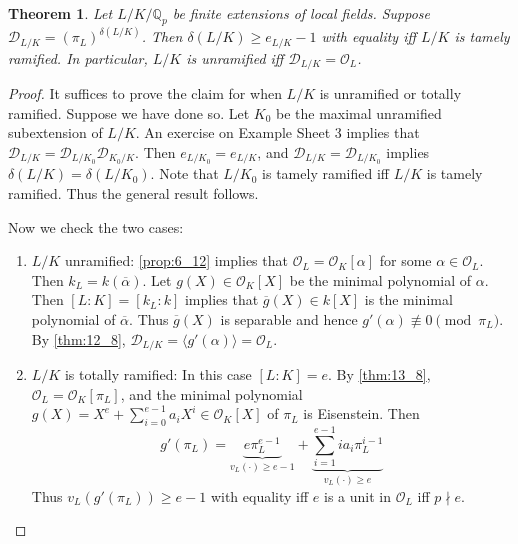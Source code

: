 \documentclass[11pt]{article}
\theoremstyle{definition}
\theoremstyle{plain}
\newtheorem{theorem}[definition]{Theorem}
\theoremstyle{remark}
\newcommand{\QQ}{\mathbb{Q}}
\newcommand{\cD}{\mathcal{D}}
\newcommand{\cO}{\mathcal{O}}
\begin{document}
\begin{theorem}\label{thm:14_5}
    Let $L/K/\QQ_p$ be finite extensions of local fields. Suppose $\cD_{L/K} = (\pi_L)^{\delta(L/K)}$. Then $\delta(L/K) \ge e_{L/K} - 1$ with equality iff $L/K$ is tamely ramified. In particular, $L/K$ is unramified iff $\cD_{L/K} = \cO_L$.
\end{theorem}
\begin{proof}
    It suffices to prove the claim for when $L/K$ is unramified or totally ramified. Suppose we have done so. Let $K_0$ be the maximal unramified subextension of $L/K$. An exercise on Example Sheet 3 implies that $\cD_{L/K} = \cD_{L/K_0} \cD_{K_0/K}$. Then $e_{L/K_0} = e_{L/K}$, and $\cD_{L/K} = \cD_{L / K_0}$ implies $\delta(L/K) = \delta(L/K_0)$. Note that $L/K_0$ is tamely ramified iff $L/K$ is tamely ramified. Thus the general result follows.

    Now we check the two cases:
    \begin{enumerate}
        \item $L/K$ unramified:
            \autoref{prop:6_12} implies that $\cO_L = \cO_K[\alpha]$ for some $\alpha \in \cO_L$. Then $k_L = k(\overline{\alpha})$. Let $g(X) \in \cO_K[X]$ be the minimal polynomial of $\alpha$. Then $[L : K] = [k_L : k]$ implies that $\overline{g}(X) \in k[X]$ is the minimal polynomial of $\overline{\alpha}$. Thus $\overline{g}(X)$ is separable and hence $g'(\alpha) \not\equiv 0 \pmod{\pi_L}$. By \autoref{thm:12_8}, $\cD_{L/K} = \langle g'(\alpha) \rangle = \cO_L$.

        \item $L/K$ is totally ramified:
            In this case $[L : K] = e$. By \autoref{thm:13_8}, $\cO_L = \cO_K[\pi_L]$, and the minimal polynomial $g(X) = X^e + \sum_{i=0}^{e-1} a_i X^i \in \cO_K[X]$ of $\pi_L$ is Eisenstein. Then
            \begin{equation*}
                g'(\pi_L) = \underbrace{e \pi_L^{e-1}}_{v_L(\cdot) \ge e - 1} + \underbrace{\sum_{i=1}^{e-1} i a_i \pi_L^{i-1}}_{v_L(\cdot) \ge e}
            \end{equation*}
            Thus $v_L(g'(\pi_L)) \ge e - 1$ with equality iff $e$ is a unit in $\cO_L$ iff $p \nmid e$. \qedhere
    \end{enumerate}
\end{proof}
\end{document}
